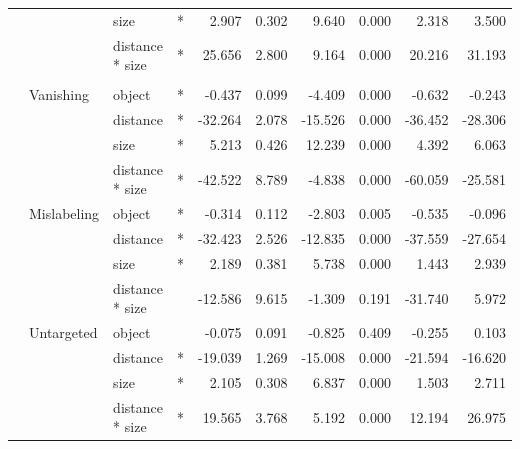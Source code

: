 \begin{longtable}[t]{llllrrrrrr}
\cmidrule{3-10}\nopagebreak
\hspace{1em} &  & size & * & 2.907 & 0.302 & 9.640 & 0.000 & 2.318 & 3.500\\
\cmidrule{3-10}\nopagebreak
\hspace{1em} &  & distance * size & * & 25.656 & 2.800 & 9.164 & 0.000 & 20.216 & 31.193\\
\cmidrule{1-10}\pagebreak[0]
\addlinespace[0.3em]
\multicolumn{10}{l}{\textbf{Cascade R-CNN}}\\
\hspace{1em} & Vanishing & object & * & -0.437 & 0.099 & -4.409 & 0.000 & -0.632 & -0.243\\
\cmidrule{3-10}\nopagebreak
\hspace{1em} &  & distance & * & -32.264 & 2.078 & -15.526 & 0.000 & -36.452 & -28.306\\
\cmidrule{3-10}\nopagebreak
\hspace{1em} &  & size & * & 5.213 & 0.426 & 12.239 & 0.000 & 4.392 & 6.063\\
\cmidrule{3-10}\nopagebreak
\hspace{1em} &  & distance * size & * & -42.522 & 8.789 & -4.838 & 0.000 & -60.059 & -25.581\\
\cmidrule{2-10}\nopagebreak
\hspace{1em} & Mislabeling & object & * & -0.314 & 0.112 & -2.803 & 0.005 & -0.535 & -0.096\\
\cmidrule{3-10}\nopagebreak
\hspace{1em} &  & distance & * & -32.423 & 2.526 & -12.835 & 0.000 & -37.559 & -27.654\\
\cmidrule{3-10}\nopagebreak
\hspace{1em} &  & size & * & 2.189 & 0.381 & 5.738 & 0.000 & 1.443 & 2.939\\
\cmidrule{3-10}\nopagebreak
\hspace{1em} &  & distance * size &  & -12.586 & 9.615 & -1.309 & 0.191 & -31.740 & 5.972\\
\cmidrule{2-10}\nopagebreak
\hspace{1em} & Untargeted & object &  & -0.075 & 0.091 & -0.825 & 0.409 & -0.255 & 0.103\\
\cmidrule{3-10}\nopagebreak
\hspace{1em} &  & distance & * & -19.039 & 1.269 & -15.008 & 0.000 & -21.594 & -16.620\\
\cmidrule{3-10}\nopagebreak
\hspace{1em} &  & size & * & 2.105 & 0.308 & 6.837 & 0.000 & 1.503 & 2.711\\
\cmidrule{3-10}\nopagebreak
\hspace{1em} &  & distance * size & * & 19.565 & 3.768 & 5.192 & 0.000 & 12.194 & 26.975\\
\bottomrule
\end{longtable}
\endgroup{}

